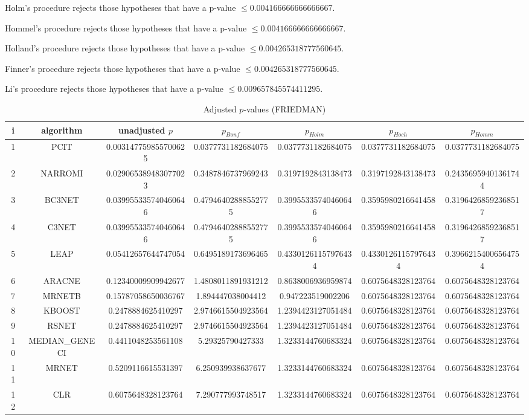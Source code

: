 \documentclass[a4paper,10pt]{article}
\begin{document}
\begin{landscape}
Holm's procedure rejects those hypotheses that have a p-value $\le0.004166666666666667$.


Hommel's procedure rejects those hypotheses that have a p-value $\le0.004166666666666667$.


Holland's procedure rejects those hypotheses that have a p-value $\le0.004265318777560645$.


Finner's procedure rejects those hypotheses that have a p-value $\le0.004265318777560645$.


Li's procedure rejects those hypotheses that have a p-value $\le0.009657845574411295$.



\newpage

\begin{table}[!htp]
\centering\scriptsize
\caption{Adjusted $p$-values (FRIEDMAN)}
\begin{tabular}{ccccccc}
i&algorithm&unadjusted $p$&$p_{Bonf}$&$p_{Holm}$&$p_{Hoch}$&$p_{Homm}$\\
\hline
1&PCIT&0.003147759855700625&0.0377731182684075&0.0377731182684075&0.0377731182684075&0.0377731182684075\\
2&NARROMI&0.029065389483077023&0.3487846737969243&0.3197192843138473&0.3197192843138473&0.24356959401361744\\
3&BC3NET&0.039955335740460646&0.47946402888552775&0.39955335740460646&0.3595980216641458&0.31964268592368517\\
4&C3NET&0.039955335740460646&0.47946402888552775&0.39955335740460646&0.3595980216641458&0.31964268592368517\\
5&LEAP&0.05412657644747054&0.6495189173696465&0.43301261157976434&0.43301261157976434&0.39662154006564754\\
6&ARACNE&0.12340009909942677&1.4808011891931212&0.8638006936959874&0.6075648328123764&0.6075648328123764\\
7&MRNETB&0.15787058650036767&1.894447038004412&0.947223519002206&0.6075648328123764&0.6075648328123764\\
8&KBOOST&0.2478884625410297&2.9746615504923564&1.2394423127051484&0.6075648328123764&0.6075648328123764\\
9&RSNET&0.2478884625410297&2.9746615504923564&1.2394423127051484&0.6075648328123764&0.6075648328123764\\
10&MEDIAN_GENECI&0.4411048253561108&5.29325790427333&1.3233144760683324&0.6075648328123764&0.6075648328123764\\
11&MRNET&0.5209116615531397&6.250939938637677&1.3233144760683324&0.6075648328123764&0.6075648328123764\\
12&CLR&0.6075648328123764&7.290777993748517&1.3233144760683324&0.6075648328123764&0.6075648328123764\\
\hline
\end{tabular}
\end{table}


\end{landscape}
\end{document}
